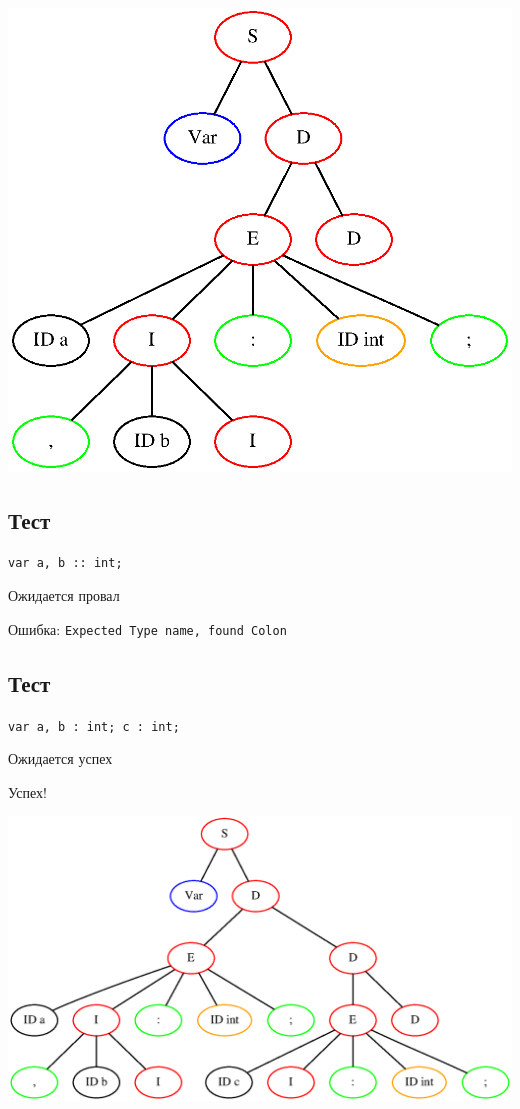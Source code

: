 \includegraphics[width=\textwidth]{test3.eps}

\subsection{Тест }

\texttt{var a, b :: int;}

Ожидается провал

Ошибка: \texttt{Expected Type name, found Colon}

\subsection{Тест }

\texttt{var a, b : int; c : int;}

Ожидается успех

Успех! 

\includegraphics[width=\textwidth]{test5.eps}

